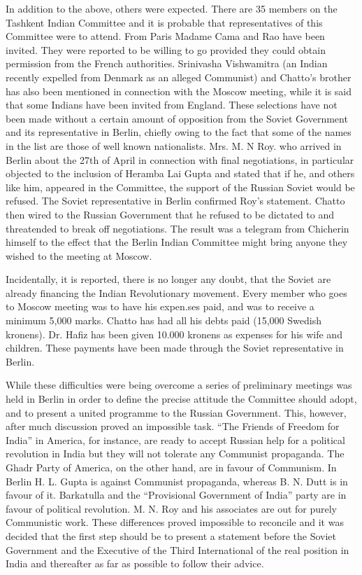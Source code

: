 In addition to the above, others were expected. There are 35 members on the Tashkent Indian Committee and it is probable that representatives of this Committee were to attend. From Paris Madame Cama and Rao have been invited. They were reported to be willing to go provided they 
could obtain permission from the French authorities. Srinivasha Vishwamitra (an Indian recently expelled from Denmark as an alleged Communist) and Chatto’s brother has also been mentioned in connection with the Moscow meeting, while it is said that some Indians have been invited 
from England. These selections have not been made without a certain amount of opposition from the Soviet Government and its representative in Berlin, chiefly owing to the fact that some of the names in the list are those of well known nationalists. Mrs. M. N Roy. who arrived in Berlin about the 27th of April in connection with final negotiations, in particular objected to the inclusion of Heramba Lai Gupta 
and stated that if he, and others like him, appeared in the Committee, the support of the Russian Soviet would be refused. The Soviet representative in Berlin confirmed Roy’s statement. Chatto then wired to the Russian Government that he refused to be dictated to and threatended to break off negotiations. The result was a telegram from Chicherin himself to the effect that the Berlin Indian Committee might 
bring anyone they wished to the meeting at Moscow. 

Incidentally, it is reported, there is no longer any doubt, that the Soviet are already financing the Indian Revolutionary movement. Every member who goes to Moscow meeting was to have his expen.ses paid, and was to receive a minimum 5,000 marks. Chatto has had all his debts paid (15,000 Swedish kronens). Dr. Hafiz has been given 10.000 kronens as expenses for his wife and children. These payments have been made through the Soviet representative in Berlin. 

While these difficulties were being overcome a series of preliminary meetings was held in Berlin in order to define the precise attitude the Committee should adopt, and to present a united programme to the Russian Government. This, however, after much discussion proved an impossible task. “The Friends of Freedom for India” in America, for instance, are ready to accept Russian help for a political revolution in India but they will not tolerate any Communist propaganda. The Ghadr Party of America, on the other hand, are in favour of Communism. In Berlin H. L. Gupta is against Communist propaganda, whereas B. N. Dutt is in favour of it. Barkatulla and the “Provisional Government of India” party are in favour of political revolution. M. N. Roy and his associates are out for purely Communistic work. These differences proved impossible to reconcile and it was decided that the first step should be to present a statement before the Soviet Government and the Executive of the Third International of the real position in India and thereafter as far as possible to follow their advice. \\

